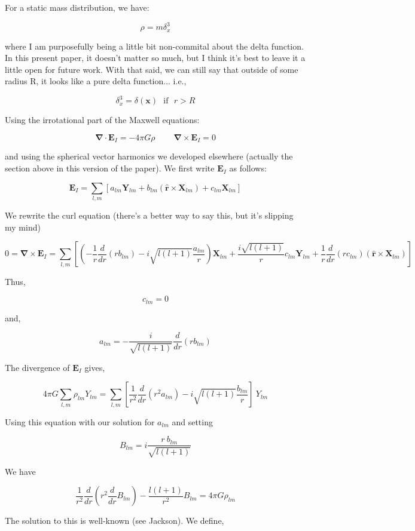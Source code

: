 \documentclass {article}
\renewcommand\vec{\mathbf}
\let\OldS\nabla
\renewcommand{\nabla}{\boldsymbol{\OldS}}
\let\OldHat\hat
\renewcommand{\hat}[1]{\OldHat{\mathbf{#1}}}
\begin{document}
For a static mass distribution, we have:

$$\rho = m \delta^3_x  $$

where I am purposefully being a little bit non-commital about the delta function. In this present paper, it doesn't matter so much, but I think it's best to leave it a little open for future work. With that said, we can still say that outside of some radius R, it looks like a pure delta function... i.e.,

$$\delta^3_x = \delta(\vec x) ~~~ \textrm{if} ~~~ r > R $$

Using the irrotational part of the Maxwell equations:

$$\nabla \cdot \vec{E}_I = -4 \pi G \rho ~~~~~~~~~~ \nabla \times \vec{E}_I = 0$$

and using the spherical vector harmonics we developed elsewhere (actually the section above in this version of the paper).  We first write $\vec E_I $ as follows:

$$\vec E_I =  \sum_{l,m} \left[a_{lm}\vec Y_{lm} +b_{lm} (\hat r \times \vec X_{lm}) +c_{lm}\vec X_{lm} \right] $$

We rewrite the curl equation (there's a better way to say this, but it's slipping my mind)

$$ 0 = \nabla \times \vec E_I  = \sum_{l, m} \left[ \left( - \frac 1 r \frac d {dr} (r b_{lm}) - i \sqrt {l ( l +1)}  \frac {a_{lm} } r \right) \vec X_{lm} + \frac {i \sqrt {l(l+1)} } r c_{lm} \vec Y_{lm} + \frac 1 r \frac d {dr} (r c_{lm}) (\hat r \times \vec X_{lm}) \right] $$

Thus,

$$ c_{lm} = 0 $$

and,

$$a_{lm} = - \frac i {\sqrt{l(l+1)} }\frac d {dr} (r b_{lm}) $$

The divergence of $\vec E_I$ gives,

$$ 4 \pi G \sum_{l, m} \rho_{lm} Y_{lm} = \sum_{l, m} \left[ \frac 1 {r^2} \frac d {dr} (r^2 a_{lm} ) - i \sqrt{l(l+1)} \frac {b_{lm}} r  \right] ~ Y_{lm} $$

Using this equation with our solution for $a_{lm}$ and setting 

$$B_{lm} = i \frac {r ~ b_{lm}} {\sqrt {l (l+1)}} $$

We have

$$\frac 1 {r^2} \frac d {dr} \left( r^2 \frac d {dr} B_{lm} \right) - \frac {l(l+1)} {r^2} B_{lm} = 4 \pi G \rho_{lm}$$

The solution to this is well-known (see Jackson). We define,
\end{document}

